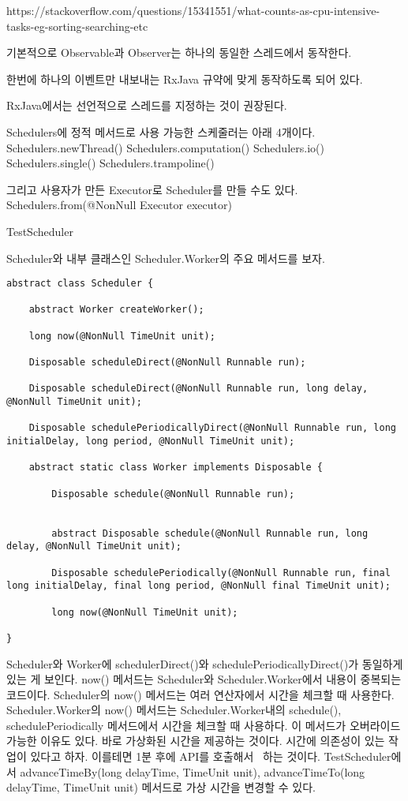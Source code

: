 \documentclass{book}
\begin{document}
{https://stackoverflow.com/questions/15341551/what-counts-as-cpu-intensive-tasks-eg-sorting-searching-etc

기본적으로 Observable과 Observer는 하나의 동일한 스레드에서 동작한다.

한번에 하나의 이벤트만 내보내는 RxJava 규약에 맞게 동작하도록 되어 있다.


RxJava에서는 선언적으로 스레드를 지정하는 것이 권장된다.

Schedulers에 정적 메서드로 사용 가능한 스케줄러는 아래 4개이다.
Schedulers.newThread()
Schedulers.computation()
Schedulers.io()
Schedulers.single()
Schedulers.trampoline()

그리고 사용자가 만든 Executor로 Scheduler를 만들 수도 있다.
Schedulers.from(@NonNull Executor executor)

TestScheduler

Scheduler와 내부 클래스인 Scheduler.Worker의 주요 메서드를 보자.
\begin{verbatim}
abstract class Scheduler {

    abstract Worker createWorker();

    long now(@NonNull TimeUnit unit);

    Disposable scheduleDirect(@NonNull Runnable run);
    
    Disposable scheduleDirect(@NonNull Runnable run, long delay, @NonNull TimeUnit unit);

    Disposable schedulePeriodicallyDirect(@NonNull Runnable run, long initialDelay, long period, @NonNull TimeUnit unit);
    
    abstract static class Worker implements Disposable {
        
        Disposable schedule(@NonNull Runnable run);

       
        abstract Disposable schedule(@NonNull Runnable run, long delay, @NonNull TimeUnit unit);

        Disposable schedulePeriodically(@NonNull Runnable run, final long initialDelay, final long period, @NonNull final TimeUnit unit);

        long now(@NonNull TimeUnit unit);

}
\end{verbatim}

Scheduler와 Worker에 schedulerDirect()와 schedulePeriodicallyDirect()가 동일하게 있는 게 보인다.
now() 메서드는 Scheduler와 Scheduler.Worker에서 내용이 중복되는 코드이다. 
Scheduler의 now() 메서드는 여러 연산자에서 시간을 체크할 때 사용한다.
Scheduler.Worker의 now() 메서드는 Scheduler.Worker내의 schedule(), schedulePeriodically 메서드에서 시간을 체크할 때 사용하다.
이 메서드가 오버라이드 가능한 이유도 있다. 바로 가상화된 시간을 제공하는 것이다.
시간에 의존성이 있는 작업이 있다고 하자. 이를테면 1분 후에 API를 호출해서 ~하는 것이다.
TestScheduler에서 advanceTimeBy(long delayTime, TimeUnit unit), advanceTimeTo(long delayTime, TimeUnit unit) 메서드로 가상 시간을 변경할 수 있다.

}
\end{document}
